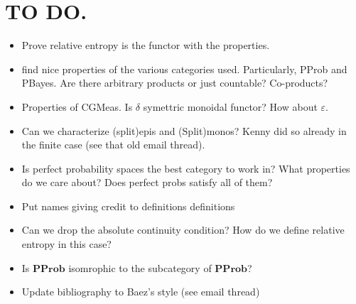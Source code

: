 \documentclass[11pt]{amsart}
\renewcommand{\epsilon}{\varepsilon}
\newcommand{\cat}[1]{\mathbf{#1}}
\theoremstyle{remark}
\theoremstyle{definition}
\begin{document}
%
\section{TO DO.}
%

\begin{itemize}
	\item Prove relative entropy is the functor with the properties.
	\item find nice properties of the various categories used. Particularly, PProb and PBayes. Are there arbitrary products or just countable?  Co-products? 
	\item Properties of CGMeas.  Is $\delta$ symettric monoidal functor?  How about $\epsilon$.  
	\item Can we characterize (split)epis and (Split)monos?  Kenny did so already in the finite case (see that old email thread).
	\item Is perfect probability spaces the best category to work in?  What properties do we care about? Does perfect probs satisfy all of them?
	\item Put names giving credit to definitions definitions 
	\item Can we drop the absolute continuity condition?  How do we define relative entropy in this case?  
	\item Is $\cat{PProb}$ isomrophic to the subcategory of $\cat{PProb}$?
	\item Update bibliography to Baez's style (see email thread)
\end{itemize}


\end{document}
